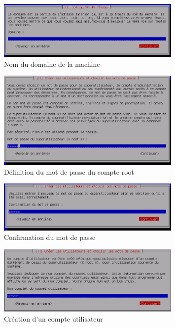 \documentclass[11pt,a4paper,titlepage, oneside]{article}
\begin{document}
	 \newpage
                \begin{figure}[h]
                        \centering
                        \includegraphics[width=0.8\textwidth,natwidth=610,natheight=642]{images/debian5.png}
                        \caption{Nom du domaine de la machine}
                \end{figure}

	 \newpage
                \begin{figure}[h]
                        \centering
                        \includegraphics[width=0.8\textwidth,natwidth=610,natheight=642]{images/debian6.png}
                        \caption{Définition du mot de passe du compte root}
                \end{figure}


	 \newpage
                \begin{figure}[h]
                        \centering
                        \includegraphics[width=0.8\textwidth,natwidth=610,natheight=642]{images/debian7.png}
                        \caption{Confirmation du mot de passe}
                \end{figure}

	 \newpage
                \begin{figure}[h]
                        \centering
                        \includegraphics[width=0.8\textwidth,natwidth=610,natheight=642]{images/debian8.png}
                        \caption{Création d'un compte utilisateur}
                \end{figure}
\end{document}
